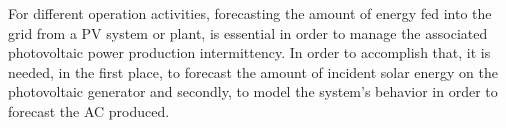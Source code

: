 
For different operation activities, forecasting the amount of energy fed into the grid from a PV system or plant, is essential in order to manage the associated photovoltaic power production intermittency. In order to accomplish that, it is needed, in the first place, to forecast the amount of incident solar energy on the photovoltaic generator and secondly, to model the system's behavior in order to forecast the AC produced.   





